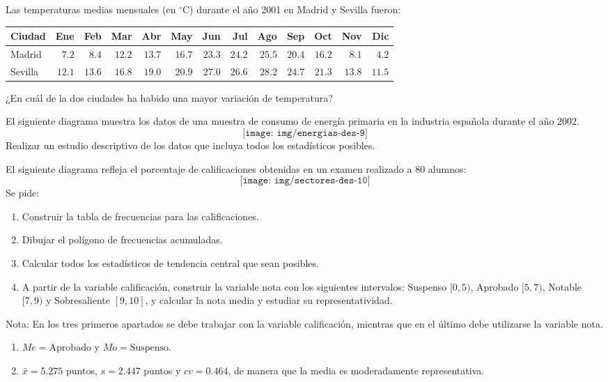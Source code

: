 {Las temperaturas medias mensuales (en $^\circ$C) durante el año 2001 en Madrid y Sevilla fueron:
\begin{center}
\begin{tabular}{|l|r|r|r|r|r|r|r|r|r|r|r|r|}
\hline
Ciudad &    Ene &    Feb &    Mar &    Abr &    May &    Jun &    Jul &    Ago &    Sep &    Oct &    Nov &    Dic \\
\hline
 Madrid                  &  $7.2$ &  $8.4$ & $12.2$ & $13.7$ & $16.7$ & $23.3$ & $24.2$ & $25.5$ & $20.4$ & $16.2$ &  $8.1$ &  $4.2$ \\
\hline
 Sevilla                 & $12.1$ & $13.6$ & $16.8$ & $19.0$ & $20.9$ & $27.0$ & $26.6$ & $28.2$ & $24.7$ & $21.3$ & $13.8$ & $11.5$ \\
\hline
\end{tabular}
\end{center}
¿En cuál de la dos ciudades ha habido una mayor variación de temperatura?
}


{El siguiente diagrama muestra los datos de una muestra de consumo de energía primaria en la industria española durante el año 2002.
\[
\texttt{[image: img/energias-des-9]}
\]
Realizar un estudio descriptivo de los datos que incluya todos los estadísticos posibles.
}


{El siguiente diagrama refleja el porcentaje de calificaciones obtenidas en un examen realizado a 80 alumnos:
\[
\texttt{[image: img/sectores-des-10]}
\]
Se pide:
\begin{enumerate}
\item Construir la tabla de frecuencias para las calificaciones.
\item Dibujar el polígono de frecuencias acumuladas.
\item Calcular todos los estadísticos de tendencia central que sean posibles.
\item A partir de la variable calificación, construir la variable nota con los siguientes intervalos: Suspenso $[0,5)$, Aprobado $[5,7)$, Notable $[7,9)$ y Sobresaliente $[9,10]$, y calcular la nota media y estudiar su representatividad.
\end{enumerate}
Nota: En los tres primeros apartados se debe trabajar con la variable calificación, mientras que en el último debe utilizarse la variable nota.
}
{\begin{enumerate}[start=3]
\item $Me=\mbox{Aprobado}$ y $Mo=\mbox{Suspenso}$.
\item $\bar x = 5.275$ puntos, $s=2.447$ puntos y $cv=0.464$, de manera que la media es moderadamente representativa.
\end{enumerate}
}
{}


